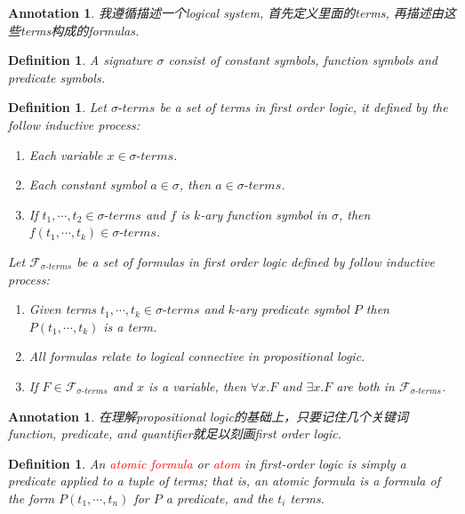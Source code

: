 \documentclass{article}
\theoremstyle{plain}
\newtheorem{definition}[theorem]{Definition}
\newtheorem{annotation}[theorem]{Annotation}
\theoremstyle{nonumberplain}
\newcommand{\redt}[1]{\textcolor{red}{#1}}
\begin{document}
\begin{annotation}
\rm 我遵循描述一个logical system, 首先定义里面的terms, 再描述由这些terms构成的formulas.
\end{annotation}

\begin{definition}
\rm A signature $\sigma$ consist of \emph{constant symbols}, \emph{function symbols} and \emph{predicate symbols}.  
\end{definition}

\begin{definition}
\rm Let $\sigma\text{-}terms$ be a set of terms in first order logic, it defined by the follow inductive process:
\begin{enumerate}
	\item Each variable $x \in \sigma\text{-}terms$.
	\item Each constant symbol $a \in \sigma$, then $a \in \sigma\text{-}terms$.
	\item If $t_1,\cdots,t_2 \in \sigma\text{-}terms$ and $f$ is $k$-ary function symbol in $\sigma$, then $f(t_1,\cdots,t_k)\in \sigma\text{-}terms$. 
\end{enumerate}
Let $\mathcal{F}_{\sigma\text{-}terms}$ be a set of formulas in first order logic defined by follow inductive process:
\begin{enumerate}
	\item Given terms $t_1, \cdots, t_k \in \sigma\text{-}terms$ and $k$-ary predicate symbol $P$ then $P(t_1,\cdots,t_k)$ is a term. 
	\item All formulas relate to logical connective in propositional logic.
	\item If $F \in \mathcal{F}_{\sigma\text{-}terms}$ and $x$ is a variable, then $\forall x. F$ and $\exists x. F$ are both in $\mathcal{F}_{\sigma\text{-}terms}$. 
\end{enumerate}
\end{definition}

\begin{annotation}
\rm 在理解propositional logic的基础上，只要记住几个关键词\emph{function}, \emph{predicate}, and \emph{quantifier}就足以刻画first order logic. 
\end{annotation}

\begin{definition}
\rm An \redt{atomic formula} or \redt{atom} in first-order logic is simply a predicate applied to a tuple of terms; that is, an atomic formula is a formula of the form $P (t_1,\cdots,t_n)$ for $P$ a predicate, and the $t_i$ terms.
\end{definition}
\end{document}
